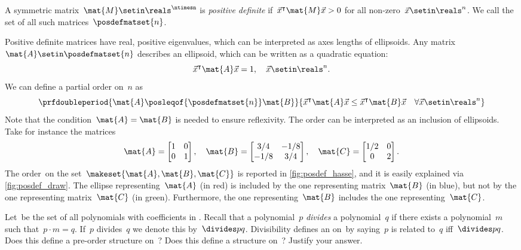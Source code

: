 \begin{definition}
    \label{def:posdef}
    A symmetric matrix~$\mat{M}\setin \reals^{\ntimesn}$ is \emph{positive definite} if~$\vec{x}^\intercal \mat{M}\vec{x}> 0$ for all non-zero~$\vec{x}\setin \reals^n$.
    We call the set of all such matrices~$\posdefmatset{n}$.
\end{definition}
Positive definite matrices have real, positive eigenvalues, which can be interpreted as axes lengths of ellipsoids.
Any matrix~$\mat{A}\setin \posdefmatset{n}$ describes an ellipsoid, which can be written as a quadratic equation:
\begin{equation}
    \label{eq:posdef-ellipsoid}
    \vec{x}^\intercal \mat{A}\vec{x}=1,\quad \vec{x}\setin \reals^n.
\end{equation}
We can define a partial order on~$n$ as
\begin{equation}
    \label{eq:posdef-order}
    \prfdoubleperiod{
        \mat{A}\posleqof{\posdefmatset{n}} \mat{B}
    }{
        \vec{x}^\intercal \mat{A}\vec{x}\leq \vec{x}^\intercal \mat{B}\vec{x} \quad \forall \vec{x}\setin \reals^n
    }
\end{equation}
Note that the condition~$\mat{A}=\mat{B}$ is needed to ensure reflexivity.
The order can be interpreted as an inclusion of ellipsoids.
Take for instance the matrices
\begin{equation}
    \label{eq:posdef-matrices}
    \mat{A}=
    \begin{bmatrix}
        1 & 0 \\0& 1
    \end{bmatrix}, \quad \mat{B}=
    \begin{bmatrix}
        3/4 & -1/8 \\-1/8& 3/4
    \end{bmatrix},\quad \mat{C}=
    \begin{bmatrix}
        1/2 & 0 \\0& 2
    \end{bmatrix}.
\end{equation}
The order~\posA on the set~$\makeset{\mat{A},\mat{B},\mat{C}}$ is reported in \cref{fig:posdef_hasse}, and it is easily explained via \cref{fig:posdef_draw}.
The ellipse representing~$\mat{A}$ (in red) is included by the one representing matrix~$\mat{B}$ (in blue), but not by the one representing matrix~$\mat{C}$ (in green).
Furthermore, the one representing~$\mat{B}$ includes the one representing~$\mat{C}$.

\vfill
\begin{gradedexercise}
    \label{ex:PolynomialDivisibility}
    Let~\setA be the set of all polynomials with coefficients in \reals.
    Recall that a polynomial~$p$ \emph{divides} a polynomial~$q$ if there exists a polynomial~$m$ such that~$p \cdot m = q$.
    If~$p$ divides~$q$ we denote this by~$\divides p q$.
    Divisibility defines an  on~\setA by saying~$p$ is related to~$q$ iff~$\divides p q$.
    Does this define a pre-order structure on~\setA?
    Does this define a  structure on~\setA?
    Justify your answer.
\end{gradedexercise}

